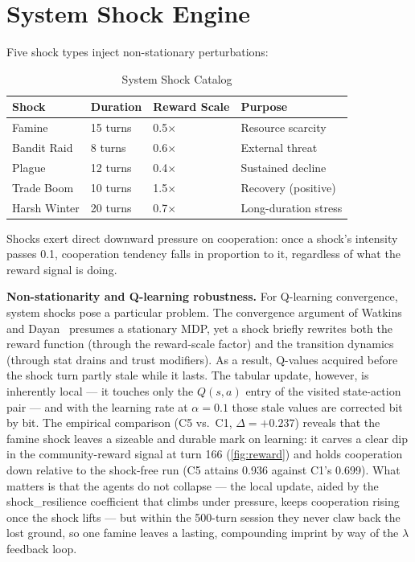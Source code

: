\documentclass[12pt, a4paper, oneside]{report}
\begin{document}
\section{System Shock Engine}
\label{sec:shock-engine}

Five shock types inject non-stationary perturbations:

\begin{table}[H]
\centering
\caption{System Shock Catalog}
\label{tab:shocks}
\begin{tabular}{llll}
\toprule
\textbf{Shock} & \textbf{Duration} & \textbf{Reward Scale} & \textbf{Purpose} \\
\midrule
Famine & 15 turns & 0.5$\times$ & Resource scarcity \\
Bandit Raid & 8 turns & 0.6$\times$ & External threat \\
Plague & 12 turns & 0.4$\times$ & Sustained decline \\
Trade Boom & 10 turns & 1.5$\times$ & Recovery (positive) \\
Harsh Winter & 20 turns & 0.7$\times$ & Long-duration stress \\
\bottomrule
\end{tabular}
\end{table}

Shocks exert direct downward pressure on cooperation: once a shock's intensity passes 0.1, cooperation tendency falls in proportion to it, regardless of what the reward signal is doing.

\textbf{Non-stationarity and Q-learning robustness.}
For Q-learning convergence, system shocks pose a particular problem. The convergence argument of Watkins and Dayan~\cite{watkins1992qlearning} presumes a stationary MDP, yet a shock briefly rewrites both the reward function (through the reward-scale factor) and the transition dynamics (through stat drains and trust modifiers). As a result, Q-values acquired before the shock turn partly stale while it lasts. The tabular update, however, is inherently local --- it touches only the $Q(s,a)$ entry of the visited state-action pair --- and with the learning rate at $\alpha = 0.1$ those stale values are corrected bit by bit. The empirical comparison (C5 vs.\ C1, $\Delta = +0.237$) reveals that the famine shock leaves a sizeable and durable mark on learning: it carves a clear dip in the community-reward signal at turn 166 (\cref{fig:reward}) and holds cooperation down relative to the shock-free run (C5 attains 0.936 against C1's 0.699). What matters is that the agents do not collapse --- the local update, aided by the shock\_resilience coefficient that climbs under pressure, keeps cooperation rising once the shock lifts --- but within the 500-turn session they never claw back the lost ground, so one famine leaves a lasting, compounding imprint by way of the $\lambda$ feedback loop.
\end{document}
